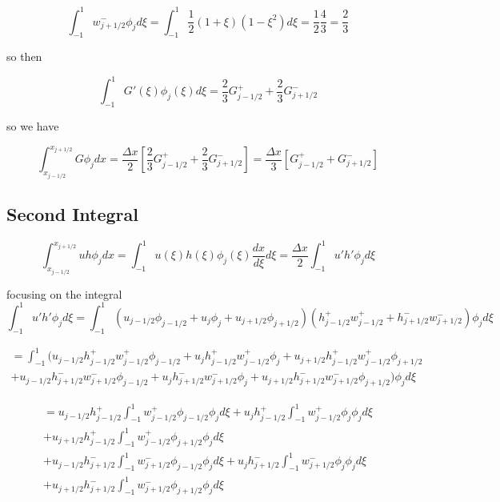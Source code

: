 \documentclass[12pt]{article}
\begin{document}
\[\int_{-1}^{1}  w^-_{j+1/2} \phi_{j}d\xi = \int_{-1}^{1} \frac{1}{2}\left(1 + \xi\right)\left(1 - \xi^2\right)d\xi = \frac{1}{2} \frac{4}{3} = \frac{2}{3} \]

so then 

\[\int_{-1}^{1} G'(\xi)\phi_{j}(\xi)d\xi = \frac{2}{3} G^+_{j-1/2}  + \frac{2}{3}G^-_{j+1/2}  \]

so we have 

\[\int_{x_{j-1/2}}^{x_{j+1/2}} G\phi_{j} dx = \frac{\Delta x}{2} \left[\frac{2}{3} G^+_{j-1/2}  + \frac{2}{3}G^-_{j+1/2}\right]  =  \frac{\Delta x}{3} \left[ G^+_{j-1/2}  + G^-_{j+1/2}\right]\]

\subsection{Second Integral}

\[\int_{x_{j-1/2}}^{x_{j+1/2}}  uh \phi_{j} dx =  \int_{-1}^{1}  u(\xi)h(\xi) \phi_{j}(\xi) \frac{d x}{d\xi}d\xi = \frac{\Delta x}{2}\int_{-1}^{1}  u'h' \phi_{j} d\xi\]

focusing on the integral 
\[\int_{-1}^{1}  u'h' \phi_{j} d\xi = \int_{-1}^{1} \left(u_{j-1/2}\phi_{j-1/2} + u_{j}\phi_{j} + u_{j+1/2}\phi_{j+1/2}\right) \left(h^+_{j-1/2} w^+_{j-1/2} +  h^-_{j+1/2} w^-_{j+1/2} \right) \phi_{j} d\xi\]

\begin{multline*}
= \int_{-1}^{1}  \Bigg(u_{j-1/2}h^+_{j-1/2} w^+_{j-1/2}\phi_{j-1/2} + u_{j}h^+_{j-1/2} w^+_{j-1/2}\phi_{j} + u_{j+1/2}h^+_{j-1/2} w^+_{j-1/2}\phi_{j+1/2}  \\ + u_{j-1/2}h^-_{j+1/2} w^-_{j+1/2}\phi_{j-1/2} + u_{j}h^-_{j+1/2} w^-_{j+1/2}\phi_{j} + u_{j+1/2}h^-_{j+1/2} w^-_{j+1/2}\phi_{j+1/2}\Bigg) \phi_{j} d\xi
\end{multline*}

\begin{multline*}
= u_{j-1/2}h^+_{j-1/2}  \int_{-1}^{1}w^+_{j-1/2}\phi_{j-1/2} \phi_{j} d\xi + 
 u_{j}h^+_{j-1/2} \int_{-1}^{1} w^+_{j-1/2}\phi_{j} \phi_{j} d\xi  \\+
 u_{j+1/2}h^+_{j-1/2} \int_{-1}^{1} w^+_{j-1/2}\phi_{j+1/2} \phi_{j} d\xi \\+
 u_{j-1/2}h^-_{j+1/2}  \int_{-1}^{1}w^-_{j+1/2}\phi_{j-1/2} \phi_{j} d\xi + 
  u_{j}h^-_{j+1/2} \int_{-1}^{1} w^-_{j+1/2}\phi_{j} \phi_{j} d\xi  \\+
  u_{j+1/2}h^-_{j+1/2} \int_{-1}^{1} w^-_{j+1/2}\phi_{j+1/2} \phi_{j} d\xi
\end{multline*}
\end{document}

